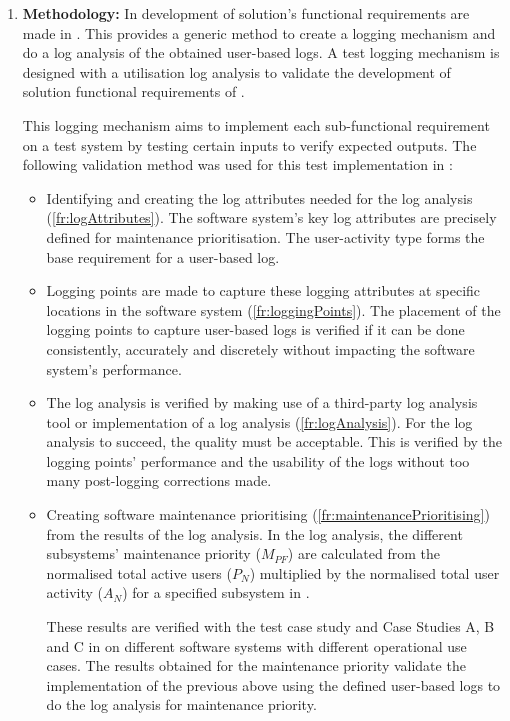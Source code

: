\begin{enumerate}[label=\textbf{\Roman*.}]
	\item \textbf{Methodology:} In  development of solution's functional requirements are made in . This provides a generic method to create a logging mechanism and do a log analysis of the obtained user-based logs. A test logging mechanism is designed with a utilisation log analysis to validate the development of solution functional requirements of .\par This logging mechanism aims to implement each sub-functional requirement on a test system by testing certain inputs to verify expected outputs. The following validation method was used for this test implementation in :
		\begin{itemize}
			\item Identifying and creating the log attributes needed for the log analysis (\ref{fr:logAttributes}). The software system's key log attributes are precisely defined for maintenance prioritisation. The user-activity type forms the base requirement for a user-based log.
			
			\item Logging points are made to capture these logging attributes at specific locations in the software system (\ref{fr:loggingPoints}). The placement of the logging points to capture user-based logs is verified if it can be done consistently, accurately and discretely without impacting the software system's performance. 
			
			\item The log analysis is verified by making use of a third-party log analysis tool or implementation of a log analysis (\ref{fr:logAnalysis}). For the log analysis to succeed, the quality must be acceptable. This is verified by the logging points' performance and the usability of the logs without too many post-logging corrections made.
			
			\item Creating software maintenance prioritising (\ref{fr:maintenancePrioritising}) from the results of the log analysis. In the log analysis, the different subsystems' maintenance priority ($M_{PF}$) are calculated from the normalised total active users ($P_N$) multiplied by the normalised total user activity ($A_N$) for a specified subsystem in .\par These results are verified with the test case study and Case Studies A, B and C in  on different software systems with different operational use cases. The results obtained for the maintenance priority validate the implementation of the previous above using the defined user-based logs to do the log analysis for maintenance priority. 
		\end{itemize}


\end{enumerate}
